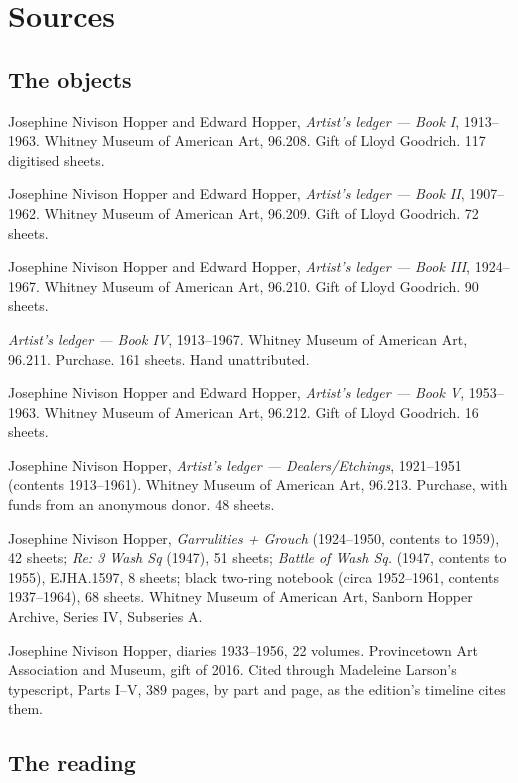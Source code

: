 \chapter{Sources}
\begingroup\setlength{\parindent}{0pt}\setlength{\parskip}{5pt plus 1pt}

\section*{The objects}

Josephine Nivison Hopper and Edward Hopper, \emph{Artist's ledger --- Book I}, 1913--1963. Whitney Museum of American Art, 96.208. Gift of Lloyd Goodrich. 117 digitised sheets.

Josephine Nivison Hopper and Edward Hopper, \emph{Artist's ledger --- Book II}, 1907--1962. Whitney Museum of American Art, 96.209. Gift of Lloyd Goodrich. 72 sheets.

Josephine Nivison Hopper and Edward Hopper, \emph{Artist's ledger --- Book III}, 1924--1967. Whitney Museum of American Art, 96.210. Gift of Lloyd Goodrich. 90 sheets.

\emph{Artist's ledger --- Book IV}, 1913--1967. Whitney Museum of American Art, 96.211. Purchase. 161 sheets. Hand unattributed.

Josephine Nivison Hopper and Edward Hopper, \emph{Artist's ledger --- Book V}, 1953--1963. Whitney Museum of American Art, 96.212. Gift of Lloyd Goodrich. 16 sheets.

Josephine Nivison Hopper, \emph{Artist's ledger --- Dealers/Etchings}, 1921--1951 (contents 1913--1961). Whitney Museum of American Art, 96.213. Purchase, with funds from an anonymous donor. 48 sheets.

Josephine Nivison Hopper, \emph{Garrulities + Grouch} (1924--1950, contents to 1959), 42 sheets; \emph{Re: 3 Wash Sq} (1947), 51 sheets; \emph{Battle of Wash Sq.} (1947, contents to 1955), EJHA.1597, 8 sheets; black two-ring notebook (circa 1952--1961, contents 1937--1964), 68 sheets. Whitney Museum of American Art, Sanborn Hopper Archive, Series IV, Subseries A.

Josephine Nivison Hopper, diaries 1933--1956, 22 volumes. Provincetown Art Association and Museum, gift of 2016. Cited through Madeleine Larson's typescript, Parts I--V, 389 pages, by part and page, as the edition's timeline cites them.

\section*{The reading}

